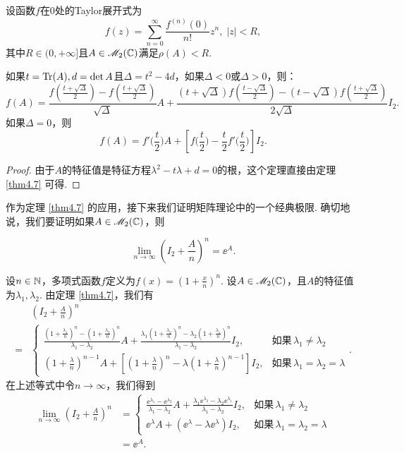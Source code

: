 \begin{mybox}
  \begin{theorem}[用$\Tr(A)$和$\det A$表示$f(A)$.]
    设函数$f$在0处的Taylor展开式为
    \[
      f(z) = \sum_{n=0}^\infty \frac{f^{(n)}(0)}{n!} z^n,\; |z|<R,
    \]
    其中$R\in(0,+\infty]$且$A\in\mathscr M_2(\mathbb C)$满足$\rho(A)<R$.

    如果$t=\operatorname{Tr}(A),d=\det A$且$\varDelta=t^2-4d$，如果$\varDelta<0$或$\varDelta>0$，则：
    \[
      f(A) = \frac{f\left( \frac{t+\sqrt\varDelta}2 \right) - f\left( \frac{t+\sqrt\varDelta}2 \right)}{\sqrt{\varDelta}} A + \frac{ (t+\sqrt{\varDelta})f\left( \frac{t-\sqrt\varDelta}2 \right) - (t-\sqrt{\varDelta})f\left( \frac{t+\sqrt\varDelta}2 \right) }{2\sqrt{\varDelta}} I_2.
    \]
    如果$\varDelta=0$，则
    \[
      f(A) = f'\Big( \frac t2 \Big) A + \left[ f\Big( \frac t2 \Big) - \frac t2f'\Big( \frac t2 \Big)\right]I_2.
    \]
  \end{theorem}
\end{mybox}

\begin{proof}
  由于$A$的特征值是特征方程$\lambda^2-t\lambda+d=0$的根，这个定理直接由定理 \ref{thm4.7} 可得.
\end{proof}

作为定理 \ref{thm4.7} 的应用，接下来我们证明矩阵理论中的一个经典极限. 确切地说，我们要证明如果$A\in\mathscr M_2(\mathbb C)$，则
\begin{mybox}
  \[
    \lim_{n\to\infty}\left( I_2 + \frac An \right)^n = \ee^A.
  \]
\end{mybox}

设$n\in\mathbb N$，多项式函数$f$定义为$f(x)=\left(1+\frac xn\right)^n$. 设$A\in\mathscr M_2(\mathbb C)$，且$A$的特征值为$\lambda_1,\lambda_2$. 由定理 \ref{thm4.7}，我们有
\begin{align*}
   & \left( I_2 + \frac An \right)^n \\
  = {}& \begin{cases}
    \frac{\left(1+\frac{\lambda_1}n\right)^n-
    \left(1+\frac{\lambda_2}n\right)^n}{\lambda_1-\lambda_2}
    A + \frac{\lambda_1\left(1+\frac{\lambda_2}n\right)^n
    -\lambda_2\left(1+\frac{\lambda_1}n\right)^n}{
    \lambda_1-\lambda_2}I_2, & \text{如果}\, \lambda_1\ne\lambda_2 \\
    \left(1+\frac\lambda n\right)^{n-1}A + \left[ \left(1+\frac\lambda n\right)^n - \lambda \left(1+\frac\lambda n\right)^{n-1} \right]I_2, & \text{如果}\,\lambda_1=\lambda_2=\lambda
  \end{cases}.
\end{align*}
在上述等式中令$n\to\infty$，我们得到
\begin{align*}
  \lim_{n\to\infty}\left( I_2 + \frac An \right)^n & = \begin{cases}
    \frac{\ee^{\lambda_1}-\ee^{\lambda_2}}{\lambda_1-\lambda_2}
    A + \frac{\lambda_1\ee^{\lambda_2}-\lambda_2\ee^{\lambda_1}}{
    \lambda_1-\lambda_2}I_2, & \text{如果}\, \lambda_1\ne\lambda_2 \\
    \ee^\lambda A + (\ee^\lambda - \lambda\ee^\lambda)I_2, & \text{如果}\,\lambda_1=\lambda_2=\lambda
  \end{cases} \\
  & = \ee^A.
\end{align*}

